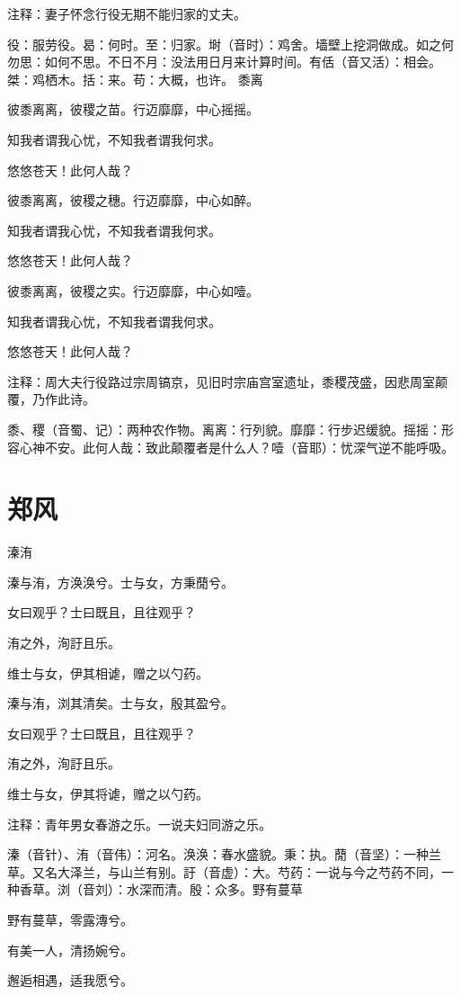 \documentclass[12pt,UTF8]{ctexbook}
\begin{document}
注释：妻子怀念行役无期不能归家的丈夫。

役：服劳役。曷：何时。至：归家。埘（音时）：鸡舍。墙壁上挖洞做成。如之何勿思：如何不思。不日不月：没法用日月来计算时间。有佸（音又活）：相会。桀：鸡栖木。括：来。苟：大概，也许。 黍离

彼黍离离，彼稷之苗。行迈靡靡，中心摇摇。

知我者谓我心忧，不知我者谓我何求。

悠悠苍天！此何人哉？

彼黍离离，彼稷之穗。行迈靡靡，中心如醉。

知我者谓我心忧，不知我者谓我何求。

悠悠苍天！此何人哉？

彼黍离离，彼稷之实。行迈靡靡，中心如噎。

知我者谓我心忧，不知我者谓我何求。

悠悠苍天！此何人哉？

注释：周大夫行役路过宗周镐京，见旧时宗庙宫室遗址，黍稷茂盛，因悲周室颠覆，乃作此诗。 

黍、稷（音蜀、记）：两种农作物。离离：行列貌。靡靡：行步迟缓貌。摇摇：形容心神不安。此何人哉：致此颠覆者是什么人？噎（音耶）：忧深气逆不能呼吸。



\part{郑风}

溱洧

溱与洧，方涣涣兮。士与女，方秉蕑兮。

女曰观乎？士曰既且，且往观乎？

洧之外，洵訏且乐。

维士与女，伊其相谑，赠之以勺药。

溱与洧，浏其清矣。士与女，殷其盈兮。

女曰观乎？士曰既且，且往观乎？

洧之外，洵訏且乐。

维士与女，伊其将谑，赠之以勺药。

注释：青年男女春游之乐。一说夫妇同游之乐。

溱（音针）、洧（音伟）：河名。涣涣：春水盛貌。秉：执。蕑（音坚）：一种兰草。又名大泽兰，与山兰有别。訏（音虚）：大。芍药：一说与今之芍药不同，一种香草。浏（音刘）：水深而清。殷：众多。野有蔓草

野有蔓草，零露漙兮。

有美一人，清扬婉兮。

邂逅相遇，适我愿兮。
\end{document}
